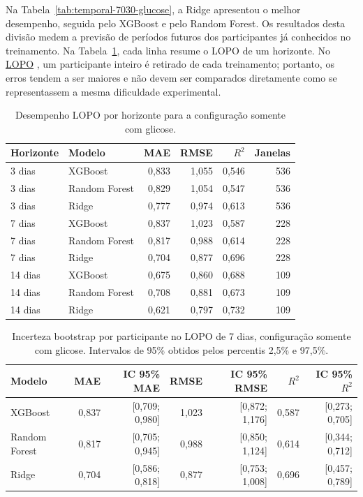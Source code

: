 \documentclass[12pt,a4paper]{article}
\DeclareRobustCommand{\sigla}[1]{%
    \texorpdfstring{\hyperlink{sigla:#1}{#1}}{#1}%
}
\begin{document}
Na Tabela~\ref{tab:temporal-7030-glucose}, a Ridge apresentou o melhor
desempenho, seguida pelo XGBoost e pelo Random Forest. Os resultados desta divisão medem
a previsão de períodos futuros dos participantes já conhecidos no treinamento.
Na Tabela~\ref{tab:horizons-glucose}, cada linha resume o LOPO de um horizonte.
No \sigla{LOPO}, um participante inteiro é retirado de cada treinamento;
portanto, os erros tendem a ser maiores e não devem ser comparados diretamente
como se representassem a mesma dificuldade experimental.

\begin{table}[H]
    \centering
    \caption{Desempenho LOPO por horizonte para a configuração somente com glicose.}
    \label{tab:horizons-glucose}
    \small
    \begin{tabular}{llrrrr}
        \toprule
        Horizonte & Modelo & MAE & RMSE & $R^2$ & Janelas \\
        \midrule
        3 dias & XGBoost & 0,833 & 1,055 & 0,546 & 536 \\
        3 dias & Random Forest & 0,829 & 1,054 & 0,547 & 536 \\
        3 dias & Ridge & 0,777 & 0,974 & 0,613 & 536 \\
        7 dias & XGBoost & 0,837 & 1,023 & 0,587 & 228 \\
        7 dias & Random Forest & 0,817 & 0,988 & 0,614 & 228 \\
        7 dias & Ridge & 0,704 & 0,877 & 0,696 & 228 \\
        14 dias & XGBoost & 0,675 & 0,860 & 0,688 & 109 \\
        14 dias & Random Forest & 0,708 & 0,881 & 0,673 & 109 \\
        14 dias & Ridge & 0,621 & 0,797 & 0,732 & 109 \\
        \bottomrule
    \end{tabular}
\end{table}

\begin{table}[H]
    \centering
    \caption{Incerteza bootstrap por participante no LOPO de 7 dias,
    configuração somente com glicose. Intervalos de 95\% obtidos pelos
    percentis 2,5\% e 97,5\%.}
    \label{tab:incerteza-lopo-7d}
    \small
    \begin{tabular}{lrrrrrr}
        \toprule
        Modelo & MAE & IC 95\% MAE & RMSE & IC 95\% RMSE &
        $R^2$ & IC 95\% $R^2$ \\
        \midrule
        XGBoost & 0,837 & [0,709; 0,980] & 1,023 & [0,872; 1,176]
        & 0,587 & [0,273; 0,705] \\
        Random Forest & 0,817 & [0,705; 0,945] & 0,988
        & [0,850; 1,124] & 0,614 & [0,344; 0,712] \\
        Ridge & 0,704 & [0,586; 0,818] & 0,877
        & [0,753; 1,008] & 0,696 & [0,457; 0,789] \\
        \bottomrule
    \end{tabular}
\end{table}
\end{document}
